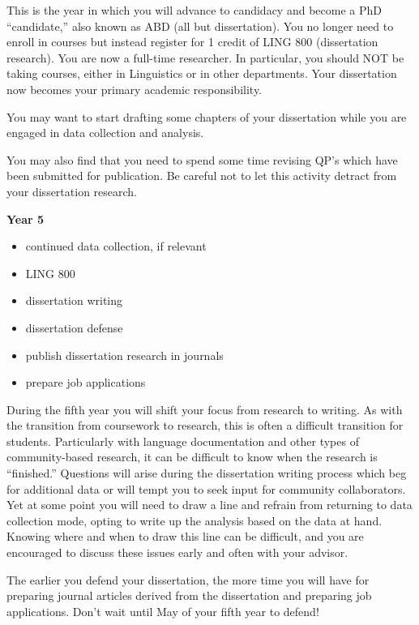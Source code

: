 \documentclass[
]{book}
\providecommand{\tightlist}{%
  \setlength{\itemsep}{0pt}\setlength{\parskip}{0pt}}
\begin{document}
This is the year in which you will advance to candidacy and become a PhD ``candidate,'' also known as ABD (all but dissertation). You no longer need to enroll in courses but instead register for 1 credit of LING 800 (dissertation research). You are now a full-time researcher. In particular, you should NOT be taking courses, either in Linguistics or in other departments. Your dissertation now becomes your primary academic responsibility.

You may want to start drafting some chapters of your dissertation while you are engaged in data collection and analysis.

You may also find that you need to spend some time revising QP's which have been submitted for publication. Be careful not to let this activity detract from your dissertation research.

\textbf{Year 5}

\begin{itemize}
\tightlist
\item
  continued data collection, if relevant
\item
  LING 800
\item
  dissertation writing
\item
  dissertation defense
\item
  publish dissertation research in journals
\item
  prepare job applications
\end{itemize}

During the fifth year you will shift your focus from research to writing. As with the transition from coursework to research, this is often a difficult transition for students. Particularly with language documentation and other types of community-based research, it can be difficult to know when the research is ``finished.'' Questions will arise during the dissertation writing process which beg for additional data or will tempt you to seek input for community collaborators. Yet at some point you will need to draw a line and refrain from returning to data collection mode, opting to write up the analysis based on the data at hand. Knowing where and when to draw this line can be difficult, and you are encouraged to discuss these issues early and often with your advisor.

The earlier you defend your dissertation, the more time you will have for preparing journal articles derived from the dissertation and preparing job applications. Don't wait until May of your fifth year to defend!
\end{document}
